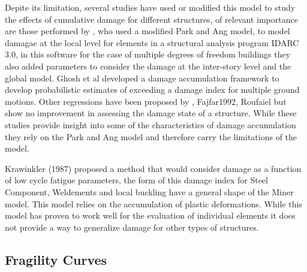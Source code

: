 Depite its limitation, several studies have used or modified this model to study the effects of cumulative damage for different structures,  of relevant importance are those performed by \cite{Kunnath1992}, who used a modified Park and Ang model, to model damagae at the local level for elements in a structural analysis program IDARC 3.0, in this software for the case of multiple degrees of freedom buildings they also added parameters to consider the damage at the inter-story level and the global model. Ghosh et al \cite{Ghosh2015} developed a damage accumulation framework to develop probabilistic estimates of exceeding a damage index for multiple ground motions. Other regressions have been proposed by \cite{Khashaee}, {Fajfar1992}, {Roufaiel} but show no improvement in assessing the damage state of a structure. While these studies provide insight into some of the characteristics of damage accumulation they rely on the Park and Ang model and therefore carry the limitations of the model.

Krawinkler (1987) \cite{Krawinkler1987} proposed a method that would consider damage as a function of low cycle fatigue parameters, the form of this damage index for Steel Component, Weldements and local buckling have a general shape of the Miner model. This model relies on the accumulation of plastic deformations. While this model has proven to work well for the evaluation of individual elements it does not provide a way to generalize damage for other types of structures.

\subsection{Fragility Curves}


